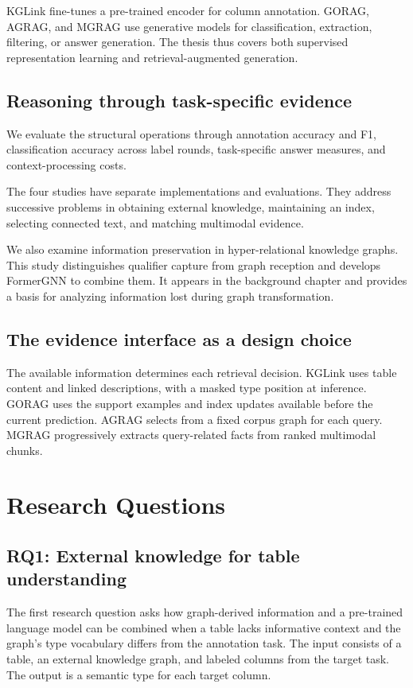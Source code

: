 KGLink fine-tunes a pre-trained encoder for column annotation. GORAG, AGRAG, and MGRAG use generative models for classification, extraction, filtering, or answer generation. The thesis thus covers both supervised representation learning and retrieval-augmented generation.

\subsection{Reasoning through task-specific evidence}

We evaluate the structural operations through annotation accuracy and F1, classification accuracy across label rounds, task-specific answer measures, and context-processing costs.

The four studies have separate implementations and evaluations. They address successive problems in obtaining external knowledge, maintaining an index, selecting connected text, and matching multimodal evidence.

We also examine information preservation in hyper-relational knowledge graphs. This study distinguishes qualifier capture from graph reception and develops FormerGNN to combine them. It appears in the background chapter and provides a basis for analyzing information lost during graph transformation.

\subsection{The evidence interface as a design choice}
The available information determines each retrieval decision. KGLink uses table content and linked descriptions, with a masked type position at inference. GORAG uses the support examples and index updates available before the current prediction. AGRAG selects from a fixed corpus graph for each query. MGRAG progressively extracts query-related facts from ranked multimodal chunks.

\section{Research Questions}
\label{sec:introduction:questions}
\subsection{RQ1: External knowledge for table understanding}
The first research question asks how graph-derived information and a pre-trained language model can be combined when a table lacks informative context and the graph's type vocabulary differs from the annotation task. The input consists of a table, an external knowledge graph, and labeled columns from the target task. The output is a semantic type for each target column.

